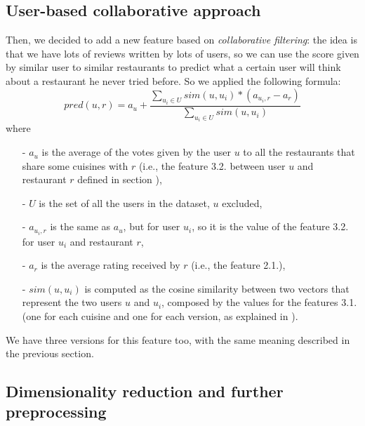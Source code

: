 \subsection{User-based collaborative approach}\label{sec:coll-appr}

Then, we decided to add a new feature based on \textit{collaborative filtering}: the idea is that we have lots of reviews written by lots of users, so we can use the score given by similar user to similar restaurants to predict what a certain user will think about a restaurant he never tried before.
So we applied the following formula:
\begin{equation}
    pred(u, r) = a_u + \frac{\sum_{u_i \in U} sim(u, u_i) * \left( a_{u_i, r} - a_r \right)} {\sum_{u_i \in U} sim(u, u_i)}
\end{equation}
where
\begin{itemize}
	\item[-] $a_u$ is the average of the votes given by the user $u$ to all the restaurants that share some cuisines with $r$ (i.e., the feature 3.2. between user $u$ and restaurant $r$ defined in section ),
	\item[-] $U$ is the set of all the users in the dataset, $u$ excluded,
	\item[-] $a_{u_i, r}$ is the same as $a_u$, but for user $u_i$, so it is the value of the feature 3.2. for user $u_i$ and restaurant $r$,
	\item[-] $a_r$ is the average rating received by $r$ (i.e., the feature 2.1.),
	\item[-] $sim(u, u_i)$ is computed as the cosine similarity between two vectors that represent the two users $u$ and $u_i$, composed by the values for the features 3.1. (one for each cuisine and one for each version, as explained in ).
\end{itemize}

We have three versions for this feature too, with the same meaning described in the previous section.

\subsection{Dimensionality reduction and further preprocessing}\label{sec:dim-red}

